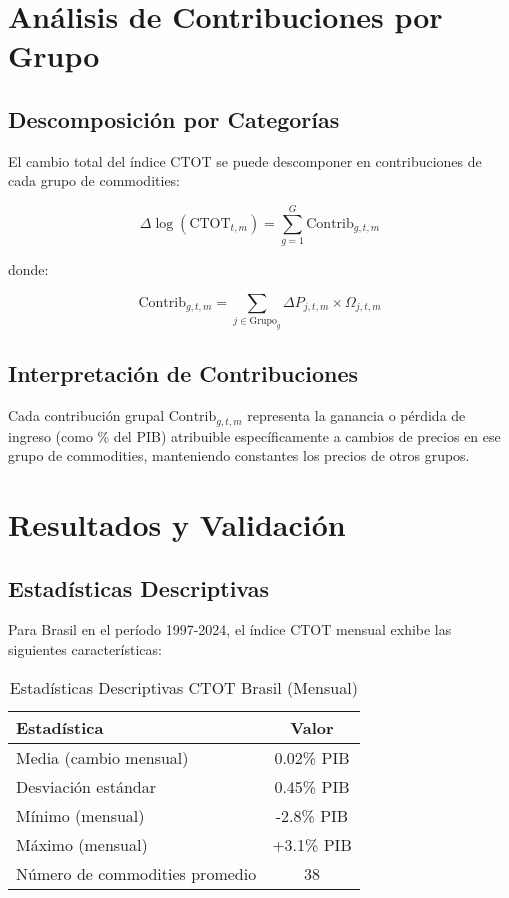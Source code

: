 \documentclass[12pt,a4paper]{article}
\begin{document}
\section{Análisis de Contribuciones por Grupo}

\subsection{Descomposición por Categorías}

El cambio total del índice CTOT se puede descomponer en contribuciones de cada grupo de commodities:

\begin{equation}
\Delta \log(\text{CTOT}_{t,m}) = \sum_{g=1}^{G} \text{Contrib}_{g,t,m}
\label{eq:group_decomposition}
\end{equation}

donde:

\begin{equation}
\text{Contrib}_{g,t,m} = \sum_{j \in \text{Grupo}_g} \Delta P_{j,t,m} \times \Omega_{j,t,m}
\label{eq:group_contribution}
\end{equation}

\subsection{Interpretación de Contribuciones}

Cada contribución grupal $\text{Contrib}_{g,t,m}$ representa la ganancia o pérdida de ingreso (como \% del PIB) atribuible específicamente a cambios de precios en ese grupo de commodities, manteniendo constantes los precios de otros grupos.

\section{Resultados y Validación}

\subsection{Estadísticas Descriptivas}

Para Brasil en el período 1997-2024, el índice CTOT mensual exhibe las siguientes características:

\begin{table}[H]
\centering
\caption{Estadísticas Descriptivas CTOT Brasil (Mensual)}
\begin{tabular}{lc}
\toprule
\textbf{Estadística} & \textbf{Valor} \\
\midrule
Media (cambio mensual) & 0.02\% PIB \\
Desviación estándar & 0.45\% PIB \\
Mínimo (mensual) & -2.8\% PIB \\
Máximo (mensual) & +3.1\% PIB \\
Número de commodities promedio & 38 \\
\bottomrule
\end{tabular}
\label{tab:descriptive_stats}
\end{table}
\end{document}
